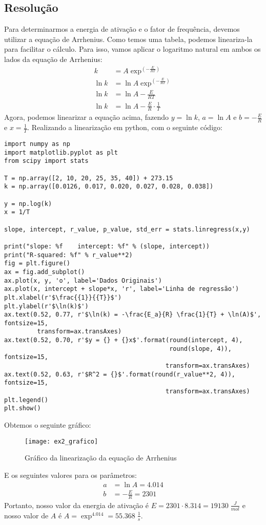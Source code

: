 \subsection{Resolução}
Para determinarmos a energia de ativação e o fator de frequência, devemos utilizar a equação de
Arrhenius. Como temos uma tabela, podemos lineariza-la para facilitar o cálculo. Para isso, vamos
aplicar o logaritmo natural em ambos os lados da equação de Arrhenius:
\begin{align}
    k &= A \exp ^{\left( -\frac{E}{RT} \right)} \\
    \ln k &= \ln A \exp ^{\left( -\frac{E}{RT} \right)} \\
    \ln k &= \ln A - \frac{E}{RT} \\
    \ln k &= \ln A - \frac{E}{R} \cdot \frac{1}{T}
\end{align}
Agora, podemos linearizar a equação acima, fazendo \(y = \ln k\), \(a = \ln A\) e \(b =
-\frac{E}{R}\) e \(x = \frac{1}{T}\). Realizando a linearização em python, com o seguinte código:
\begin{verbatim}
import numpy as np
import matplotlib.pyplot as plt
from scipy import stats

T = np.array([2, 10, 20, 25, 35, 40]) + 273.15
k = np.array([0.0126, 0.017, 0.020, 0.027, 0.028, 0.038])

y = np.log(k)
x = 1/T

slope, intercept, r_value, p_value, std_err = stats.linregress(x,y)

print("slope: %f    intercept: %f" % (slope, intercept))
print("R-squared: %f" % r_value**2)
fig = plt.figure()
ax = fig.add_subplot()
ax.plot(x, y, 'o', label='Dados Originais')
ax.plot(x, intercept + slope*x, 'r', label='Linha de regressão')
plt.xlabel(r'$\frac{{1}}{{T}}$')
plt.ylabel(r'$\ln(k)$')
ax.text(0.52, 0.77, r'$\ln(k) = -\frac{E_a}{R} \frac{1}{T} + \ln(A)$', fontsize=15,
         transform=ax.transAxes)
ax.text(0.52, 0.70, r'$y = {} + {}x$'.format(round(intercept, 4),
                                             round(slope, 4)), fontsize=15,
                                            transform=ax.transAxes)
ax.text(0.52, 0.63, r'$R^2 = {}$'.format(round(r_value**2, 4)), fontsize=15,
                                            transform=ax.transAxes)
plt.legend()
plt.show()
\end{verbatim}
Obtemos o seguinte gráfico:
\begin{figure}[H]
    \centering
    \texttt{[image: ex2\_grafico]}
    \caption{Gráfico da linearização da equação de Arrhenius}
    \label{fig:ex2_grafico}
\end{figure}
E os seguintes valores para os parâmetros:
\begin{align}
    a &= \ln A = 4.014 \\
    b &= -\frac{E}{R} = 2301
\end{align}
Portanto, nosso valor da energia de ativação é \(E = 2301 \cdot 8.314 = 19130 \; \frac{J}{mol}\) e
nosso valor de \(A\) é \(A = \exp ^{4.014} = 55.368 \; \frac{1}{s}\). 
